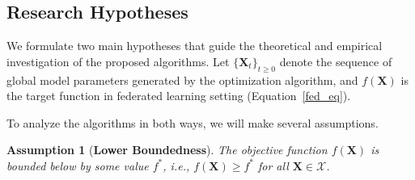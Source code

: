 \documentclass{article}
\newtheorem{assumption}{Assumption}
\begin{document}
\newpage
\subsection{Research Hypotheses}\label{app:hyp}
We formulate two main hypotheses that guide the theoretical and empirical investigation of the proposed algorithms. Let $\{\mathbf{X}_t\}_{t\ge 0}$ denote the sequence of global model parameters generated by the optimization algorithm, and $f(\mathbf{X})$ is the target function in federated learning setting (Equation~\ref{fed_eq}).

To analyze the algorithms in both ways, we will make several assumptions.
\begin{assumption}[\textbf{Lower Boundedness}]\label{as:1}
The objective function $f(\mathbf{X})$ is bounded below by some value $f^*$, i.e., $f(\mathbf{X}) \ge f^*$ for all $\mathbf{X} \in \mathcal{X}$.
\end{assumption}

\end{document}

